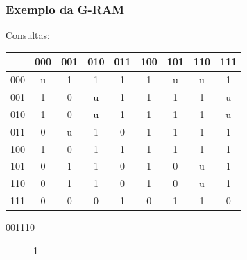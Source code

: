 \documentclass{beamer}
\begin{document}
\begin{frame}
    \frametitle{Exemplo da G-RAM}
    Consultas:

    \begin{table}
        \centering
        \begin{tabular}{|c|c|c|c|c|c|c|c|c|}
            \hline
                &       000 &       001 &       010 &       011 &       100 &       101 &       110 &       111\\
            \hline
            000 &        u  &        1  &        1  &        1  &        1  &        u  &        u  &        1 \\
            \hline
            001 &        1  &        0  &        u  &        1  &        1  &        1  &        1  &        u \\
            \hline
            010 &        1  &        0  &        u  &        1  &        1  &        1  &        1  &        u \\
            \hline
            011 &        0  &        u  &        1  &        0  &        1  &        1  &        1  &        1 \\
            \hline
            100 &        1  &        0  &        1  &        1  &        1  &        1  &        1  &        1 \\
            \hline
            101 &        0  &        1  &        1  &        0  &        1  &        0  &        u  &        1 \\
            \hline
            110 &        0  & \alert 1  &        1  &        0  &        1  &        0  &        u  &        1 \\
            \hline
            111 &        0  &        0  &        0  &        1  &        0  &        1  &        1  &        0 \\
            \hline
        \end{tabular}
    \end{table}
    \begin{description}
        \item[001110] 1
    \end{description}
\end{frame}
\end{document}
